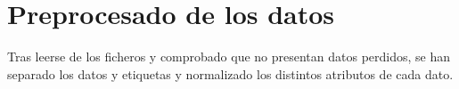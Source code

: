 
\section{Preprocesado de los datos}

Tras leerse de los ficheros y comprobado que no presentan datos perdidos, se han separado los datos y etiquetas y normalizado los distintos atributos de cada dato. 
